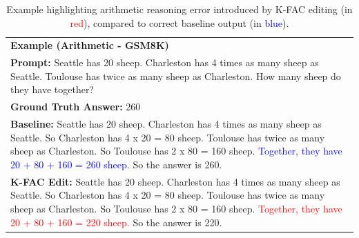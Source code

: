 \documentclass{article} %
\begin{document}
\begin{table}[ht]
\centering
\small
\begin{tabular}{p{}}
\toprule
\textbf{Example (Arithmetic - GSM8K)} \\[0.3em]
\textbf{Prompt:} Seattle has 20 sheep. Charleston has 4 times as many sheep as Seattle. Toulouse has twice as many sheep as Charleston. How many sheep do they have together? \\[0.5em]

\textbf{Ground Truth Answer:} 260 \\[0.5em]

\textbf{Baseline:} Seattle has 20 sheep. Charleston has 4 times as many sheep as Seattle. So Charleston has 4 x 20 = 80 sheep. Toulouse has twice as many sheep as Charleston. So Toulouse has 2 x 80 = 160 sheep. \textcolor{blue}{Together, they have 20 + 80 + 160 = 260 sheep.} So the answer is 260. \\[0.5em]

\textbf{K-FAC Edit:} Seattle has 20 sheep. Charleston has 4 times as many sheep as Seattle. So Charleston has 4 x 20 = 80 sheep. Toulouse has twice as many sheep as Charleston. So Toulouse has 2 x 80 = 160 sheep. \textcolor{red}{Together, they have 20 + 80 + 160 = 220 sheep.} So the answer is 220. \\[0.3em]

\bottomrule
\end{tabular}
\caption{Example highlighting arithmetic reasoning error introduced by K-FAC editing (in \textcolor{red}{red}), compared to correct baseline output (in \textcolor{blue}{blue}).}
\label{tab:example_arithmetic}
\vspace{-0.5em}
\end{table}
\end{document}
